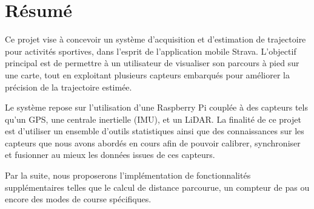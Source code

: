 \chapter*{Résumé}

Ce projet vise à concevoir un système d’acquisition et d’estimation de trajectoire pour activités sportives, dans l’esprit de l’application mobile Strava. L’objectif principal est de permettre à un utilisateur de visualiser son parcours à pied sur une carte, tout en exploitant plusieurs capteurs embarqués pour améliorer la précision de la trajectoire estimée.

Le système repose sur l’utilisation d’une Raspberry Pi couplée à des capteurs tels qu’un GPS, une centrale inertielle (IMU), et un LiDAR. La finalité de ce projet est d'utiliser un ensemble d'outils statistiques ainsi que des connaissances sur les capteurs que nous avons abordés en cours afin de pouvoir calibrer, synchroniser et fusionner au mieux les données issues de ces capteurs.

Par la suite, nous proposerons l'implémentation de fonctionnalités supplémentaires telles que le calcul de distance parcourue, un compteur de pas ou encore des modes de course spécifiques.
